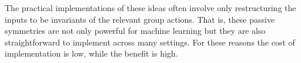 \documentclass{article}
\renewcommand{\paragraph}[1]{\par\textbf{#1}~---}
\begin{document}
The practical implementations of these ideas often involve only restructuring the inputs to be invariants of the relevant group actions.
That is, these passive symmetries are not only powerful for machine learning but they are also straightforward to implement across many settings.
For these reasons the cost of implementation is low, while the benefit is high.



\raggedright

\end{document}
